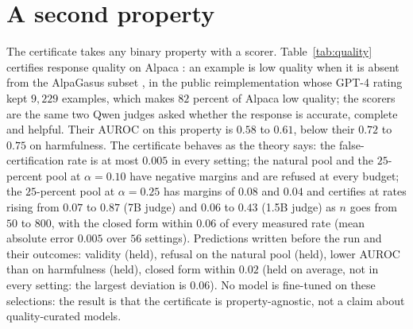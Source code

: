 \documentclass{article} %
\makeatletter
\newcommand{\tabinput}[1]{\@@input#1 }
\makeatother
\begin{document}
\section{A second property}
\label{app:quality}
\begin{table}[h]
\centering\small
\caption{The certificate on response quality: Alpaca pools of $4000$, low quality as the property, certification rate against $n$ as measured/closed form over $200$ draws, $\delta = 0.1$, and the worst false-certification rate over the grid.}
\label{tab:quality}
\resizebox{\linewidth}{!}{\tabinput{data/tables/e7_quality.tex}}
\end{table}
The certificate takes any binary property with a scorer. Table~\ref{tab:quality} certifies response quality on Alpaca \citep{taori2023alpaca}: an example is low quality when it is absent from the AlpaGasus subset \citep{chen2023alpagasus}, in the public reimplementation whose GPT-4 rating kept $9{,}229$ examples, which makes $82$ percent of Alpaca low quality; the scorers are the same two Qwen judges asked whether the response is accurate, complete and helpful. Their AUROC on this property is $0.58$ to $0.61$, below their $0.72$ to $0.75$ on harmfulness. The certificate behaves as the theory says: the false-certification rate is at most $0.005$ in every setting; the natural pool and the $25$-percent pool at $\alpha = 0.10$ have negative margins and are refused at every budget; the $25$-percent pool at $\alpha = 0.25$ has margins of $0.08$ and $0.04$ and certifies at rates rising from $0.07$ to $0.87$ (7B judge) and $0.06$ to $0.43$ (1.5B judge) as $n$ goes from $50$ to $800$, with the closed form within $0.06$ of every measured rate (mean absolute error $0.005$ over $56$ settings). Predictions written before the run and their outcomes: validity (held), refusal on the natural pool (held), lower AUROC than on harmfulness (held), closed form within $0.02$ (held on average, not in every setting: the largest deviation is $0.06$). No model is fine-tuned on these selections: the result is that the certificate is property-agnostic, not a claim about quality-curated models.
\end{document}
